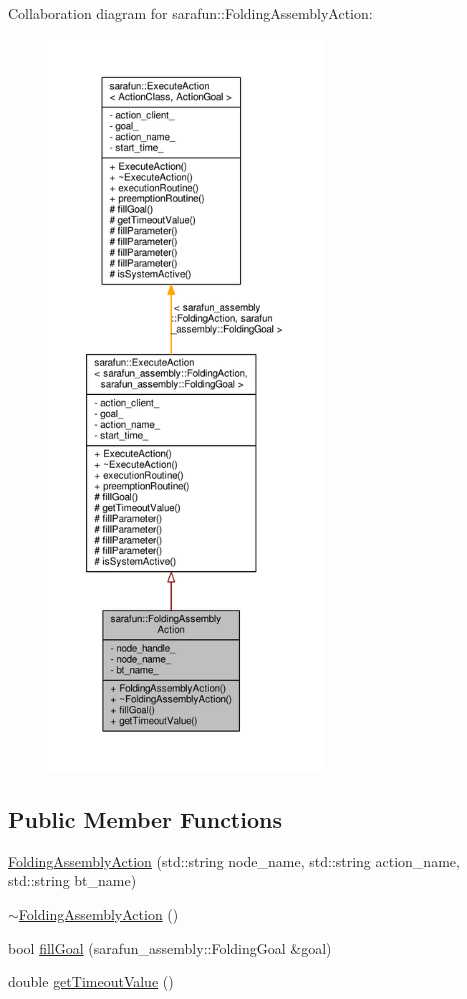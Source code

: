 Collaboration diagram for sarafun\-:\-:Folding\-Assembly\-Action\-:\nopagebreak
\begin{figure}[H]
\begin{center}
\leavevmode
\includegraphics[height=550pt]{de/d2e/classsarafun_1_1FoldingAssemblyAction__coll__graph}
\end{center}
\end{figure}
\subsection*{Public Member Functions}
\begin{DoxyCompactItemize}
\item 
\hyperlink{classsarafun_1_1FoldingAssemblyAction_afc2da251f362a62c892f41d8e0bea0e5_afc2da251f362a62c892f41d8e0bea0e5}{Folding\-Assembly\-Action} (std\-::string node\-\_\-name, std\-::string action\-\_\-name, std\-::string bt\-\_\-name)
\item 
\hyperlink{classsarafun_1_1FoldingAssemblyAction_a0e38e473ec7b9327dc0a4d32e11cc0d6_a0e38e473ec7b9327dc0a4d32e11cc0d6}{$\sim$\-Folding\-Assembly\-Action} ()
\item 
bool \hyperlink{classsarafun_1_1FoldingAssemblyAction_a51597860319456f359d03c3e27c2fb96_a51597860319456f359d03c3e27c2fb96}{fill\-Goal} (sarafun\-\_\-assembly\-::\-Folding\-Goal \&goal)
\item 
double \hyperlink{classsarafun_1_1FoldingAssemblyAction_a14174e375aa1b8d5b63159f275b7d971_a14174e375aa1b8d5b63159f275b7d971}{get\-Timeout\-Value} ()
\end{DoxyCompactItemize}
